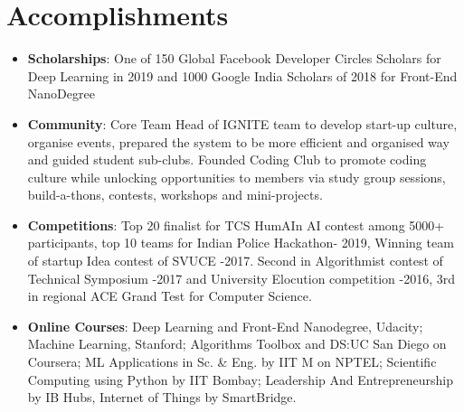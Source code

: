 \documentclass[letterpaper,11pt]{article}
\newcommand{\resumeItem}[2]{
  \item\small{
    \textbf{#1}{: #2 \vspace{-2pt}}
  }
}
\newcommand{\resumeSubItem}[2]{\resumeItem{#1}{#2}\vspace{-4pt}}
\newcommand{\resumeSubHeadingListStart}{\begin{itemize}[leftmargin=*]}
\newcommand{\resumeSubHeadingListEnd}{\end{itemize}}
\begin{document}
 \section{Accomplishments}
   \resumeSubHeadingListStart
  
    \resumeSubItem{Scholarships}
      {One of 150 Global Facebook  Developer  Circles  Scholars  for  Deep  Learning in 2019 and  1000  Google  India  Scholars of 2018 for  Front-End NanoDegree}
    \resumeSubItem{Community}
      {Core Team Head of IGNITE  team  to  develop  start-up  culture,  organise  events,  prepared  the system to be more efficient and organised way and guided student sub-clubs. Founded Coding Club to promote coding culture while unlocking opportunities to members via study group sessions, build-a-thons, contests, workshops and mini-projects.}
    
    \resumeSubItem{Competitions}
     {Top 20 finalist for TCS HumAIn AI contest among 5000+ participants, top 10 teams for Indian Police Hackathon- 2019, Winning team of startup Idea contest of SVUCE -2017. Second in Algorithmist contest of Technical Symposium -2017 and University Elocution competition -2016, 3rd in regional ACE Grand Test for Computer Science.}
     
     \resumeSubItem{Online Courses} 
      {Deep Learning and Front-End Nanodegree, Udacity; Machine Learning, Stanford; Algorithms Toolbox and DS:UC San Diego on Coursera; ML Applications in Sc. \& Eng. by IIT M on NPTEL; Scientific Computing using Python by IIT Bombay; Leadership And Entrepreneurship by IB Hubs, Internet of Things by SmartBridge.}
      
  \resumeSubHeadingListEnd

 
%


\end{document}
